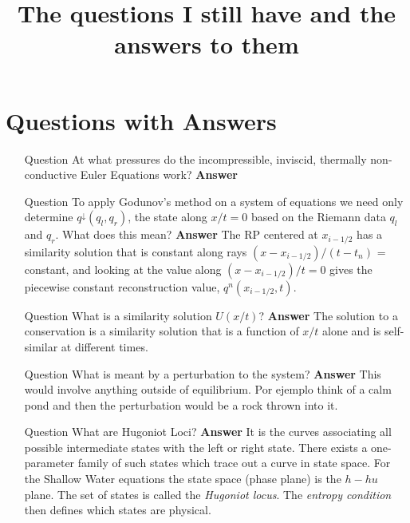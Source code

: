 \documentclass[]{article}
\title{The questions I still have and the answers to them}
\author{}
\begin{document}
\maketitle

\begin{abstract}

\end{abstract}

\section{Questions with Answers}

	\begin{itemize}
		
		\item[Question] At what pressures do the incompressible, inviscid, thermally non-conductive Euler Equations work?
		\subitem\textbf{Answer}
		
		
		\item[Question] To apply Godunov's method on a system of equations we need only determine $ q^\downarrow(q_l, q_r)$, the state along $ x/t = 0 $ based on the Riemann data $ q_l $ and $ q_r $. What does this mean?
		\subitem\textbf{Answer} The RP centered at $ x_{i-1/2} $ has a similarity solution that is constant along rays $ (x - x_{i-1/2})/(t - t_n) $ = constant,  and looking at the value along $ (x - x_{i-1/2})/t = 0 $ gives the piecewise constant reconstruction value, $ q^n(x_{i-1/2},t) $.
		
		
		\item[Question] What is a similarity solution $ U(x/t) $?
		\subitem\textbf{Answer} The solution to a conservation is a similarity solution that is a function of $ x/t $ alone and is self-similar at different times.
		
		
		\item[Question] What is meant by a perturbation to the system?
		\subitem\textbf{Answer} This would involve anything outside of equilibrium. Por ejemplo think of a calm pond and then the perturbation would be a rock thrown into it.
		
		
		\item[Question] What are Hugoniot Loci?
		\subitem\textbf{Answer} It is the curves associating all possible intermediate states with the left or right state. There exists a one-parameter family of such states which trace out a curve in state space. For the Shallow Water equations the state space (phase plane) is the $ h-hu $ plane. The set of states is called the \textit{Hugoniot locus}. The \textit{entropy condition} then defines which states are physical.
		

\end{itemize}
\end{document}
